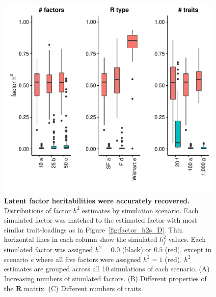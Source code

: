 \documentclass[12pt,titlepage]{article}
\begin{document}
\begin{figure}[b]
\begin{center}
\includegraphics[width=5in]{Figures/factor_h2.pdf}
\caption[Heritability of latent factors]{ \textbf{Latent factor heritabilities were accurately recovered.} Distributions of factor $h^2$ estimates by simulation scenario. Each simulated factor was matched to the estimated factor with most similar trait-loadings as in Figure~\ref{fig:factor_h2s_D}. Thin horizontal lines in each column show the simulated $h^2_j$ values. Each simulated factor was assigned $h^2 = 0.0$ (black) or $0.5$ (red), except in scenario \emph{e} where all five factors were assigned $h^2 = 1$ (red). $h^2$ estimates are grouped across all 10 simulations of each scenario. (A) Increasing numbers of simulated factors. (B) Different properties of the $\mathbf{R}$ matrix. (C) Different numbers of traits.}
\label{fig:factor_h2s_ABC}
\end{center}
\end{figure}
\end{document}
